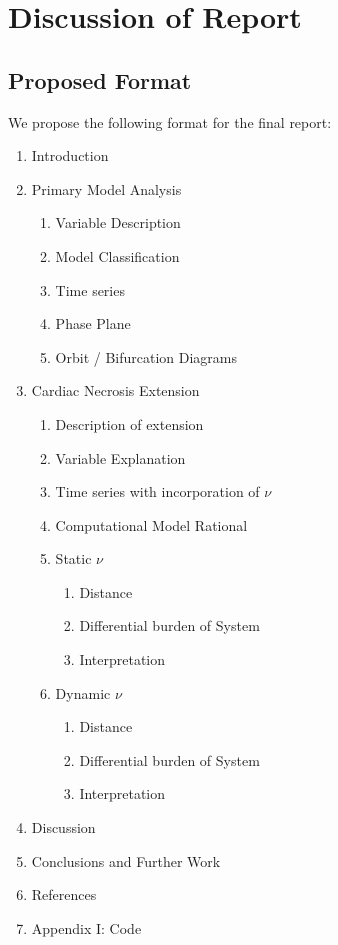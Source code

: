 \documentclass[11pt]{article}
\begin{document}
\section{Discussion of Report} %
\label{sec:discussion_of_report}

\subsection{Proposed Format} %
\label{sub:proposed_format}

We propose the following format for the final report:

\begin{enumerate}
	\item Introduction
	\item Primary Model Analysis
	\begin{enumerate}
		\item Variable Description
		\item Model Classification
		\item Time series 
		\item Phase Plane
		\item Orbit / Bifurcation Diagrams
	\end{enumerate}
	\item Cardiac Necrosis Extension
	\begin{enumerate}
		\item Description of extension
		\item Variable Explanation
		\item Time series with incorporation of $\nu$
		\item Computational Model Rational
		\item Static $\nu$
		\begin{enumerate}
			\item Distance
			\item Differential burden of System 
			\item Interpretation
		\end{enumerate}
		\item Dynamic $\nu$
		\begin{enumerate}
			\item Distance
			\item Differential burden of System 
			\item Interpretation
		\end{enumerate}
	\end{enumerate}
	\item Discussion
	\item Conclusions and Further Work
	\item References
	\item Appendix I: Code 
\end{enumerate}
\end{document}
